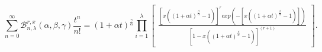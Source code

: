 \documentclass[12pt]{amsart}
\newtheorem{proof 1}{proof 1}
\newtheorem{theorem}{Theorem}[section]
\begin{document}
\begin{equation}\label{equation:40}
	\sum\limits_{n=0}^{\infty}\mathcal{B}^{r,x}_{n,\lambda}(\alpha,\beta,\gamma)\frac{t^n}{n!}=(1+\alpha t)^{\frac{\gamma}{\alpha}}\prod_{i=1}^{\lambda}\begin{bmatrix}\frac{[x((1+\alpha t)^\frac{\beta}{\alpha}-1)]^{r}exp(-[x((1+\alpha t)^\frac{\beta}{\alpha}-1)])}{[1-x((1+\alpha t)^\frac{\beta}{\alpha}-1)]^{(r+1)}}\end{bmatrix}.
\end{equation}
	
	
\end{document}
